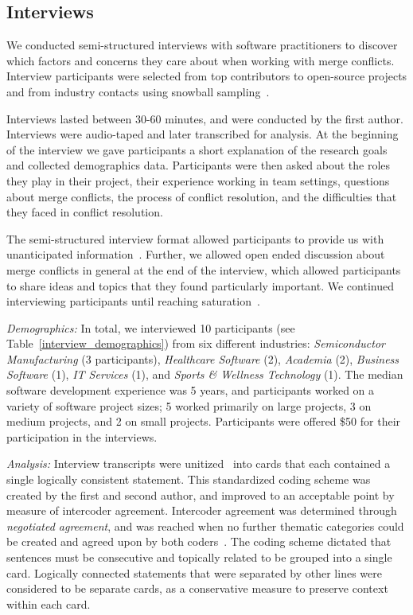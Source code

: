 \subsection{Interviews}\label{interview_methods}

We conducted semi-structured interviews with software practitioners to discover which factors and concerns they care about when working with merge conflicts.
Interview participants were selected from top contributors to open-source projects and from industry contacts using snowball sampling~\cite{goodman1961snowball}.

Interviews lasted between 30-60 minutes, and were conducted by the first author. 
Interviews were audio-taped and later transcribed for analysis. 
At the beginning of the interview we gave participants a short explanation of the research goals and collected demographics data. 
Participants were then asked about the roles they play in their project, their experience working in team settings,  questions about merge conflicts, the process of conflict resolution, and the difficulties that they faced in conflict resolution. 

The semi-structured interview format allowed participants to provide us with unanticipated information~\cite{seaman2008qualitative}. Further, we allowed open ended discussion about merge conflicts in general at the end of the interview, which allowed participants to share ideas and topics that they found particularly important. We continued interviewing participants until reaching saturation~\cite{fusch2015we}.

\textit{Demographics:} In total, we interviewed 10 participants (see Table~\ref{interview_demographics}) from six different industries: \textit{Semiconductor Manufacturing} (3 participants), \textit{Healthcare Software} (2), \textit{Academia} (2), \textit{Business Software} (1), \textit{IT Services} (1), and \textit{Sports \& Wellness Technology} (1). The median software development experience was 5 years, and participants worked on a variety of software project sizes; 5 worked primarily on large projects, 3 on medium projects, and 2 on small projects. Participants were offered \$50 for their participation in the interviews.

\textit{Analysis:} Interview transcripts were unitized~\cite{unitization} into cards that each contained a single logically consistent statement. This standardized coding scheme was created by the first and second author, and improved to an acceptable point by measure of intercoder agreement.
Intercoder agreement was determined through \textit{negotiated agreement}, and was reached when no further thematic categories could be created and agreed upon by both coders~\cite{garrison2006revisiting}\cite{ritchie2013qualitative}.
The coding scheme dictated that sentences must be consecutive and topically related to be grouped into a single card. Logically connected statements that were separated by other lines were considered to be separate cards, as a conservative measure to preserve context within each card.

